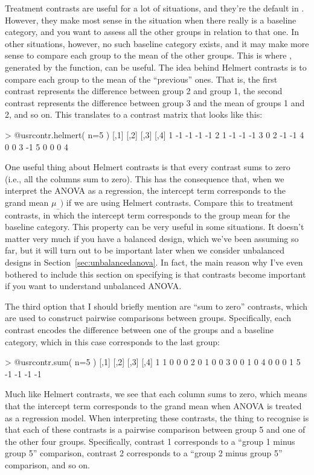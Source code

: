 Treatment contrasts are useful for a lot of situations, and they're the default in \R. However, they make most sense in the situation when there really is a baseline category, and you want to assess all the other groups in relation to that one. In other situations, however, no such baseline category exists, and it may make more sense to compare each group to the mean of the other groups. This is where , generated by the  function, can be useful. The idea behind Helmert contrasts is to compare each group to the mean of the ``previous'' ones. That is, the first contrast represents the difference between group 2 and group 1, the second contrast represents the difference between group 3 and the mean of groups 1 and 2, and so on. This translates to a contrast matrix that looks like this:
\begin{rblock1}
> @usr{contr.helmert( n=5 )}
  [,1] [,2] [,3] [,4]
1   -1   -1   -1   -1
2    1   -1   -1   -1
3    0    2   -1   -1
4    0    0    3   -1
5    0    0    0    4
\end{rblock1}
One useful thing about Helmert contrasts is that every contrast sums to zero (i.e., all the columns sum to zero). This has the consequence that, when we interpret the ANOVA as a regression, the intercept term corresponds to the grand mean $\mu_{..})$ if we are using Helmert contrasts. Compare this to treatment contrasts, in which the intercept term corresponds to the group mean for the baseline category. This property can be very useful in some situations. It doesn't matter very much if you have a balanced design, which we've been assuming so far, but it will turn out to be important later when we consider unbalanced designs in Section~\ref{sec:unbalancedanova}. In fact, the main reason why I've even bothered to include this section on specifying is that contrasts become important if you want to understand unbalanced ANOVA.
 
 
The third option that I should briefly mention are ``sum to zero'' contrasts, which are used to construct pairwise comparisons between groups. Specifically, each contrast encodes the difference between one of the groups and a baseline category, which in this case corresponds to the last group: 
\begin{rblock1}
> @usr{contr.sum( n=5 )}
  [,1] [,2] [,3] [,4]
1    1    0    0    0
2    0    1    0    0
3    0    0    1    0
4    0    0    0    1
5   -1   -1   -1   -1
\end{rblock1}  
Much like Helmert contrasts, we see that each column sums to zero, which means that the intercept term corresponds to the grand mean when ANOVA is treated as a regression model. When interpreting these contrasts, the thing to recognise is that each of these contrasts is a pairwise comparison between group 5 and one of the other four groups. Specifically, contrast 1 corresponds to a ``group 1 minus group 5'' comparison, contrast 2 corresponds to a ``group 2 minus group 5'' comparison, and so on. 

